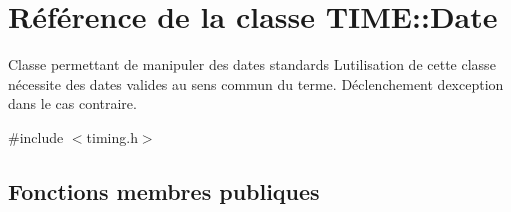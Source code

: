 \hypertarget{class_t_i_m_e_1_1_date}{}\section{Référence de la classe T\+I\+M\+E\+:\+:Date}
\label{class_t_i_m_e_1_1_date}


Classe permettant de manipuler des dates standards L\textquotesingle{}utilisation de cette classe nécessite des dates valides au sens commun du terme. Déclenchement d\textquotesingle{}exception dans le cas contraire.  




{\ttfamily \#include $<$timing.\+h$>$}

\subsection*{Fonctions membres publiques}
